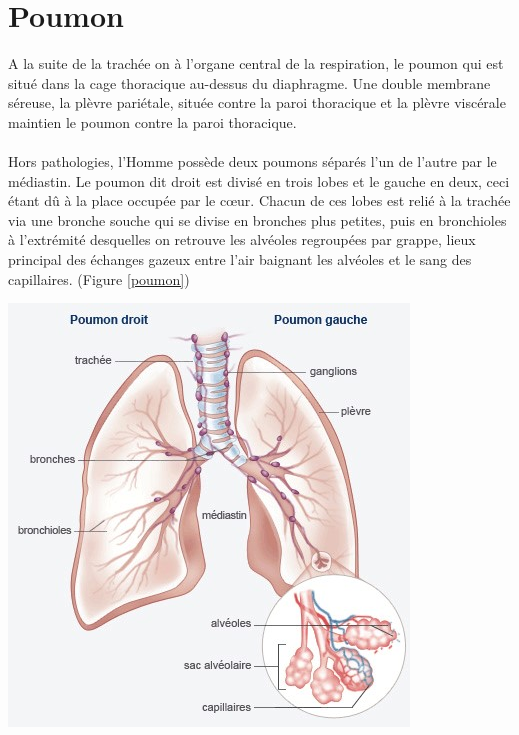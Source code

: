 
\chapter{Poumon} %


\label{ch:01-02} %



A la suite de la trachée on à l’organe central de la respiration, le poumon qui est situé dans la cage thoracique au-dessus du diaphragme. Une double membrane séreuse, la plèvre pariétale, située contre la paroi thoracique et la plèvre viscérale maintien le poumon contre la paroi thoracique. \\
\\
Hors pathologies, l’Homme possède deux poumons séparés l’un de l’autre par le médiastin. Le poumon dit droit est divisé en trois lobes et le gauche en deux, ceci étant dû à la place occupée par le cœur. Chacun de ces lobes est relié à la trachée via une bronche souche qui se divise en bronches plus petites, puis en bronchioles à l’extrémité desquelles on retrouve les alvéoles regroupées par grappe, lieux principal des échanges gazeux entre l'air baignant les alvéoles et le sang des capillaires. (Figure \ref{poumon})

\begin{center}
\includegraphics[scale=0.7]{gfx/poumon.jpg} 
       \label{poumon}
\end{center}

